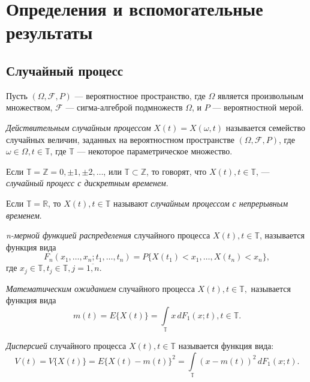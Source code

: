 \newpage
\chapter{Определения и вспомогательные результаты}
\label{c:definitions}

\section{Случайный процесс}

Пусть $ (\Omega, \mathcal{F}, P) $ --- вероятностное пространство, где $\Omega$ является произвольным множеством, $\mathcal{F}$ --- сигма-алгеброй подмножеств $\Omega$, и $P$ --- вероятностной мерой.

\textit{Действительным случайным процессом} $ X(t) = X(\omega, t) $ называется семейство случайных величин, заданных на вероятностном пространстве $ (\Omega, \mathcal{F}, P) $, где $ \omega \in \Omega, t \in \mathbb{T}$, где $ \mathbb{T} $ --- некоторое параметрическое множество.

Если $ \mathbb{T} = \mathbb{Z} = {0, \pm 1, \pm 2, \dots} $, или $ \mathbb{T} \subset \mathbb{Z} $, то говорят, что $ X(t), t \in \mathbb{T} $, --- \textit{случайный процесс с дискретным временем}.

Если $ \mathbb{T} = \mathbb{R} $, то $ X(t), t \in \mathbb{T} $ называют \textit{случайным процессом с непрерывным временем}.

\textit{n-мерной функцией распределения} случайного процесса $ X(t), t \in \mathbb{T} $, называется функция вида
\begin{equation*}
	F_n(x_1, \dots, x_n; t_1, \dots, t_n) = P \{ X(t_1) < x_1, \dots, X(t_n) < x_n \},
\end{equation*}
где $ x_j \in \mathbb{T}, t_j \in \mathbb{T}, j = \overline{1,n} $.

\textit{Математическим ожиданием} случайного процесса $ X(t), t \in \mathbb{T}, $ называется функция вида
\begin{equation*}
	m(t) = E \{ X(t) \} = \int \limits_{\mathbb{T}} x \, dF_1(x;t), t \in \mathbb{T}.
\end{equation*}

\textit{Дисперсией} случайного процесса $ X(t), t \in \mathbb{T} $ называется функция вида:
\begin{equation*}
	V(t) = V \{ X(t) \} = E \{ X(t) - m(t) \}^2 = \int \limits_{\mathbb{T}} (x - m(t))^2 \, dF_1(x; t).
\end{equation*}

